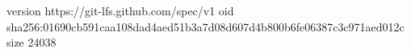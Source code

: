 version https://git-lfs.github.com/spec/v1
oid sha256:01690cb591caa108dad4aed51b3a7d08d607d4b800b6fe06387c3c971aed012c
size 24038
